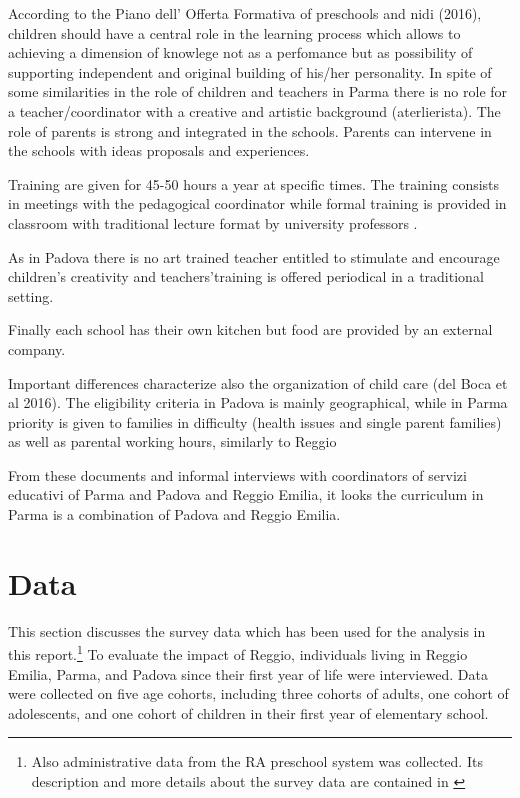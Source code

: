 \documentclass[12pt]{article}
\begin{document}
According to the Piano dell' Offerta Formativa of preschools and nidi
(2016), children should have a central role in the learning process which
allows to achieving a dimension of knowlege not as a perfomance but as
possibility of supporting independent and original building of his/her
personality. In spite of some similarities in the role of children and
teachers in Parma there is no role for a teacher/coordinator with a creative
and artistic background (aterlierista).   The role of parents is strong and
integrated in the schools. Parents can intervene in the schools with ideas
proposals and experiences. 

Training are given for 45-50 hours a year at specific times. The training
consists in meetings with the pedagogical coordinator while formal training
is provided in classroom with traditional lecture format by university
professors .

As in Padova there is no art trained teacher entitled to stimulate and
encourage children's creativity and teachers'training is offered periodical
in a traditional setting.

Finally each school has their own kitchen but food are provided by an
external company.

Important differences characterize also the organization of child care (del
Boca et al 2016). The eligibility criteria in Padova is mainly geographical,
while in Parma priority is given to families in difficulty (health issues
and single parent families) as well as parental working hours, similarly to
Reggio \citep{Frabboni1999}

From these documents and informal interviews with coordinators of servizi
educativi of Parma and Padova and Reggio Emilia, it looks the curriculum in
Parma is a combination of Padova and Reggio Emilia.

%

\section{Data}

\label{sec:data}

This section discusses the survey data which has been used for the analysis
in this report.\footnote{%
Also administrative data from the RA preschool system was collected. Its
description and more details about the survey data are contained in %
\citet{biroli2015evaluating}} To evaluate the impact of Reggio, individuals
living in Reggio Emilia, Parma, and Padova since their first year of life
were interviewed. Data were collected on five age cohorts, including three
cohorts of adults, one cohort of adolescents, and one cohort of children in
their first year of elementary school.
\end{document}
